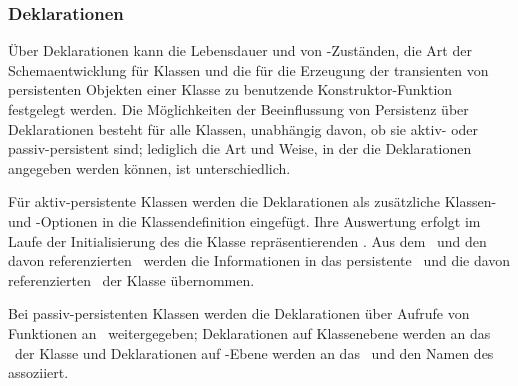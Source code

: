 \subsubsection{Deklarationen}
%
\"{U}ber Deklarationen kann die Lebensdauer und \representationform{} von
\Slt\/-Zust\"{a}nden, die Art der Schemaentwicklung f\"{u}r Klassen und die
f\"{u}r die Erzeugung der transienten \representations{} von persistenten
Objekten einer Klasse zu benutzende Konstruktor-Funktion festgelegt
werden. Die M\"{o}glichkeiten der Beeinflussung von Persistenz \"{u}ber
Deklarationen besteht f\"{u}r alle Klassen, un\-ab\-h\"{a}n\-gig davon, ob
sie aktiv- oder passiv-persistent sind; lediglich die Art und Weise,
in der die Deklarationen angegeben werden k\"{o}nnen, ist
unterschiedlich.
%
\par{}F\"{u}r aktiv-persistente Klassen werden die Deklarationen als
zu\-s\"{a}tz\-li\-che Klassen- und \Slt\/-Optionen in die
Klassendefinition eingef\"{u}gt. Ihre Auswertung erfolgt im Laufe der
Initialisierung des die Klasse repr\"{a}sentierenden \clsmo[es].  Aus dem
\clsmo\ und den davon referenzierten \mo[en]\ werden die Informationen
in das persistente \clsdo\ und die davon referenzierten \deo[e]\ der
Klasse \"{u}bernommen.
%
\par{}Bei passiv-persistenten Klassen werden die Deklarationen \"{u}ber
Aufrufe von Funktionen an \plob\ weitergegeben; Deklarationen auf
Klassenebene werden an das \clsmo\ der Klasse und Deklarationen auf
\Slt\/-Ebene werden an das \clsmo\ und den Namen des
\Slt[s]\/ assoziiert.
%
